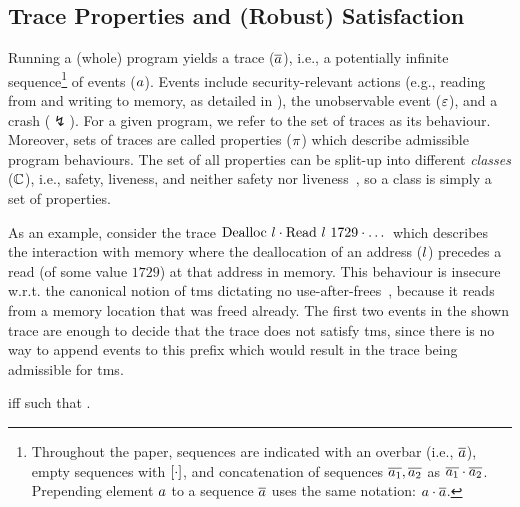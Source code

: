 \subsection{Trace Properties and (Robust) Satisfaction}\label{subsec:bg:tprop}

Running a (whole) program yields a trace ($\trace$), i.e., a potentially infinite sequence\footnote{
Throughout the paper, sequences are indicated with an overbar (i.e., $\trace$), empty sequences with $\hole{\cdot}$, and concatenation of sequences $\trace[_{1}],\trace[_{2}]$ as $\trace[_{1}]\cdot\trace[_{2}]$.
Prepending element $\event$ to a sequence $\trace$ uses the same notation: $\event\cdot\trace$.
} of events ($\event$).
Events include security-relevant actions (e.g., reading from and writing to memory, as detailed in ), the unobservable event ($\emptyevent$), and a crash ($\lightning$).
For a given program, we refer to the set of traces as its behaviour. 
Moreover, sets of traces are called properties ($\varProp$) which describe admissible program behaviours. %
% 
The set of all properties can be split-up into different {\em classes} ($\class$), i.e., safety, liveness, and neither safety nor liveness~\cite{clarkson2008hyper}, so a class is simply a set of properties.
% 

As an example, consider the trace $\ev{Dealloc\ \loc}\cdot\ev{Read\ \loc\ 1729}\cdot\dots$ which describes the interaction with memory where the deallocation of an address ($\loc$) precedes a read (of some value $1729$) at that address in memory.
% 
This behaviour is insecure w.r.t. the canonical notion of \gls*{tms} dictating no use-after-frees~\cite{nagarakatte2010cets,azevedo2018meaningsofms}, because it reads from a memory location that was freed already.
The first two events in the shown trace are enough to decide that the trace does not satisfy \gls*{tms}, since there is no way to append events to this prefix which would result in the trace being admissible for \gls*{tms}.

 iff  such that .

